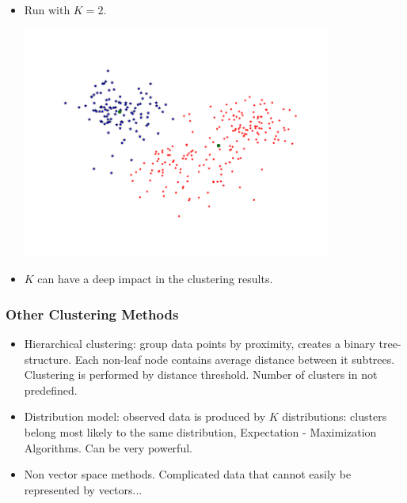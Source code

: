 \documentclass[10pt]{beamer}
\begin{document}
\begin{frame}
  \begin{itemize}
  \item Run with $K = 2$.
    \begin{center}
      \includegraphics[width=0.8\textwidth]{FIGURES/2DData2Clusters}
    \end{center}
  \item $K$ can have a deep impact in the clustering results. 
  \end{itemize}
\end{frame}

\begin{frame}
  \frametitle{Other Clustering Methods}
  \begin{itemize}
  \item Hierarchical clustering: group data points by proximity,
    creates a binary tree-structure.  Each non-leaf node contains
    average distance between it subtrees. Clustering is performed by
    distance threshold. Number of clusters in not predefined.
  \item Distribution model: observed data is produced by $K$
    distributions: clusters belong most likely to the same
    distribution, Expectation - Maximization Algorithms. Can be very powerful.
  \item Non vector space methods. Complicated data that cannot easily
    be represented by vectors...
  \end{itemize}
  
\end{frame}
\end{document}
